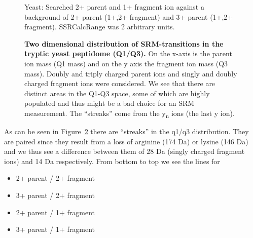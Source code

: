 \begin{figure}


\label{y_true_false}
\caption{Yeast: Searched 2+ parent and 1+ fragment ion against a background of 2+ parent (1+,2+ fragment) and 3+ parent (1+,2+ fragment).
SSRCalcRange was 2 arbitrary units.
}
\end{figure}

\begin{figure}
\caption{
\textbf{Two dimensional distribution of SRM-transitions in the tryptic
yeast peptidome (Q1/Q3).}
On the x-axis is the parent ion mass (Q1 mass) and
on the y axis the fragment ion mass (Q3 mass). Doubly and triply charged
parent ions and singly and doubly charged fragment ions were considered.
We see that there are distinct areas in the Q1-Q3 space, some of which are highly
populated and thus might be a bad choice for an SRM measurement. 
The ``streaks'' come from the y\textsubscript{n} ions (the last y ion).
}
%
\label{y_q1q3}

\end{figure}

As can be seen in Figure~\ref{y_q1q3} there are ``streaks'' in the q1/q3
distribution. They are paired since they result from a loss of arginine
(174 Da)
or lysine (146 Da) and we thus see a difference between them of 28 Da
(singly charged fragment ions) and 14 Da respectively. 
From bottom to top we see the lines for 
\begin{itemize}
\item 2+ parent / 2+ fragment
\item 3+ parent / 2+ fragment
\item 2+ parent / 1+ fragment
\item 3+ parent / 1+ fragment
\end{itemize}




